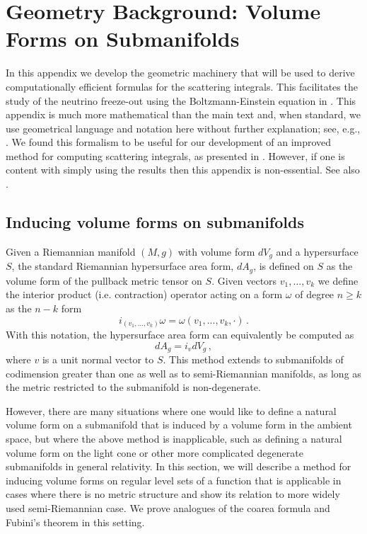 \section{Geometry Background: Volume Forms on Submanifolds}\label{ch:vol:forms}
In this appendix we develop the geometric machinery that will be used to derive computationally efficient formulas for the scattering integrals. This facilitates the study of the neutrino freeze-out using the Boltzmann-Einstein equation in . This appendix is much more mathematical than the main text and, when standard, we use geometrical language and notation here without further explanation; see, e.g., \cite{o1983semi,lee2003introduction,lee1997riemannian}. We found this formalism to be useful for our development of an improved method for computing scattering integrals, as presented in . However, if one is content with simply using the results then this appendix is non-essential. See also \cite{Birrell:2014uka}.



\subsection{Inducing volume forms on submanifolds}

Given a Riemannian manifold $(M,g)$ with volume form $dV_g$ and a hypersurface $S$, the standard Riemannian hypersurface area form, $dA_g$, is defined on $S$ as the volume form of the pullback metric tensor on $S$. Given vectors $v_1,...,v_k$ we define the interior product (i.e. contraction) operator acting on a form $\omega$ of degree $n\geq k$ as the $n-k$ form 
\begin{equation}
i_{(v_1,...,v_k)}\omega=\omega(v_1,...,v_k,\cdot)\,.
\end{equation}
 With this notation, the hypersurface area form can equivalently be computed as
\begin{equation}
dA_g=i_v dV_g\,,
\end{equation}
where $v$ is a unit normal vector to $S$. This method extends to submanifolds of codimension greater than one as well as to semi-Riemannian manifolds, as long as the metric restricted to the submanifold is non-degenerate. 

However, there are many situations where one would like to define a natural volume form on a submanifold that is induced by a volume form in the ambient space, but where the above method is inapplicable, such as defining a natural volume form on the light cone or other more complicated degenerate submanifolds in general relativity. In this section, we will describe a method for inducing volume forms on regular level sets of a function that is applicable in cases where there is no metric structure and show its relation to more widely used semi-Riemannian case. We prove analogues of the coarea formula and Fubini's theorem in this setting. 

